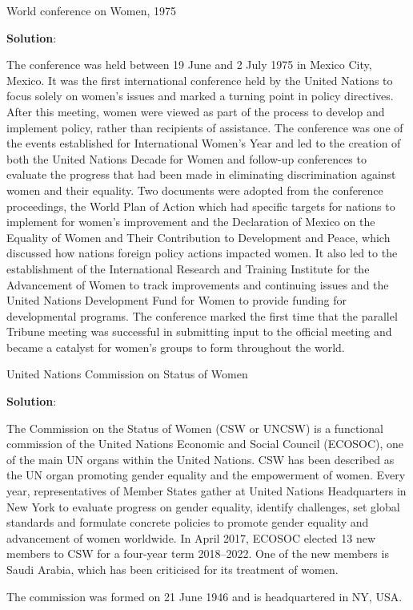 \documentclass[
]{book}
\newcommand{\question}{\item}
\newenvironment{solution}{ {\bfseries Solution}:}{}
\begin{document}
\begin{questions}

\question World conference on Women, 1975

\begin{solution}

The conference was held between 19 June and 2 July 1975 in Mexico City, Mexico. It was the first international conference held by the United Nations to focus solely on women's issues and marked a turning point in policy directives. After this meeting, women were viewed as part of the process to develop and implement policy, rather than recipients of assistance. The conference was one of the events established for International Women's Year and led to the creation of both the United Nations Decade for Women and follow-up conferences to evaluate the progress that had been made in eliminating discrimination against women and their equality. Two documents were adopted from the conference proceedings, the World Plan of Action which had specific targets for nations to implement for women's improvement and the Declaration of Mexico on the Equality of Women and Their Contribution to Development and Peace, which discussed how nations foreign policy actions impacted women. It also led to the establishment of the International Research and Training Institute for the Advancement of Women to track improvements and continuing issues and the United Nations Development Fund for Women to provide funding for developmental programs. The conference marked the first time that the parallel Tribune meeting was successful in submitting input to the official meeting and became a catalyst for women's groups to form throughout the world.

\end{solution}

\question United Nations Commission on Status of Women

\begin{solution}

The Commission on the Status of Women (CSW or UNCSW) is a functional commission of the United Nations Economic and Social Council (ECOSOC), one of the main UN organs within the United Nations. CSW has been described as the UN organ promoting gender equality and the empowerment of women. Every year, representatives of Member States gather at United Nations Headquarters in New York to evaluate progress on gender equality, identify challenges, set global standards and formulate concrete policies to promote gender equality and advancement of women worldwide. In April 2017, ECOSOC elected 13 new members to CSW for a four-year term 2018–2022. One of the new members is Saudi Arabia, which has been criticised for its treatment of women.

The commission was formed on 21 June 1946 and is headquartered in NY, USA.

\end{solution}

\end{questions}
\end{document}

